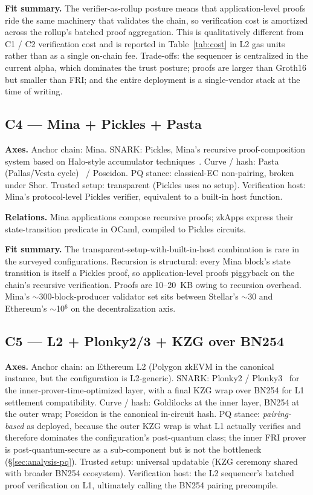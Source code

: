 \textbf{Fit summary.} The verifier-as-rollup posture means that
application-level proofs ride the same machinery that validates the
chain, so verification cost is amortized across the rollup's batched
proof aggregation. This is qualitatively different from C1 / C2
verification cost and is reported in
Table~\ref{tab:cost} in L2 gas units rather than as a single
on-chain fee. Trade-offs: the sequencer is centralized in the
current alpha, which dominates the trust posture; proofs are larger
than Groth16 but smaller than FRI; and the entire deployment is a
single-vendor stack at the time of writing.

\subsection{C4 --- Mina + Pickles + Pasta}
\label{sec:cfg-c4}

\textbf{Axes.} Anchor chain: Mina. SNARK: Pickles, Mina's recursive
proof-composition system based on Halo-style accumulator
techniques~\cite{bowe-2019-halo}. Curve / hash:
Pasta (Pallas/Vesta cycle)~\cite{hopwood-2020-pasta} / Poseidon. PQ
stance: classical-EC non-pairing, broken under Shor.
Trusted setup: transparent (Pickles uses no setup). Verification host:
Mina's protocol-level Pickles verifier, equivalent to a built-in
host function.

\textbf{Relations.} Mina applications compose recursive proofs;
zkApps express their state-transition predicate in OCaml, compiled to
Pickles circuits.

\textbf{Fit summary.} The transparent-setup-with-built-in-host
combination is rare in the surveyed configurations. Recursion is
structural: every Mina block's state transition is itself a Pickles
proof, so application-level proofs piggyback on the chain's recursive
verification. Proofs are 10--20~KB owing to recursion overhead.
Mina's $\sim$300-block-producer validator set sits between Stellar's
$\sim$30 and Ethereum's $\sim$10$^6$ on the decentralization axis.

\subsection{C5 --- L2 + Plonky2/3 + KZG over BN254}
\label{sec:cfg-c5}

\textbf{Axes.} Anchor chain: an Ethereum L2 (Polygon zkEVM in the
canonical instance, but the configuration is L2-generic). SNARK:
Plonky2 / Plonky3~\cite{plonky2-2022,plonky3-spec} for the
inner-prover-time-optimized layer, with a final KZG wrap over BN254
for L1 settlement compatibility. Curve / hash: Goldilocks at the
inner layer, BN254 at the outer wrap; Poseidon is the canonical
in-circuit hash. PQ stance: \emph{pairing-based} as deployed,
because the outer KZG wrap is what L1 actually verifies and
therefore dominates the configuration's post-quantum class; the
inner FRI prover is post-quantum-secure as a sub-component but is
not the bottleneck (\S\ref{sec:analysis-pq}). Trusted setup:
universal updatable (KZG ceremony shared with broader BN254
ecosystem). Verification host: the L2 sequencer's batched proof
verification on L1, ultimately calling the BN254 pairing precompile.

